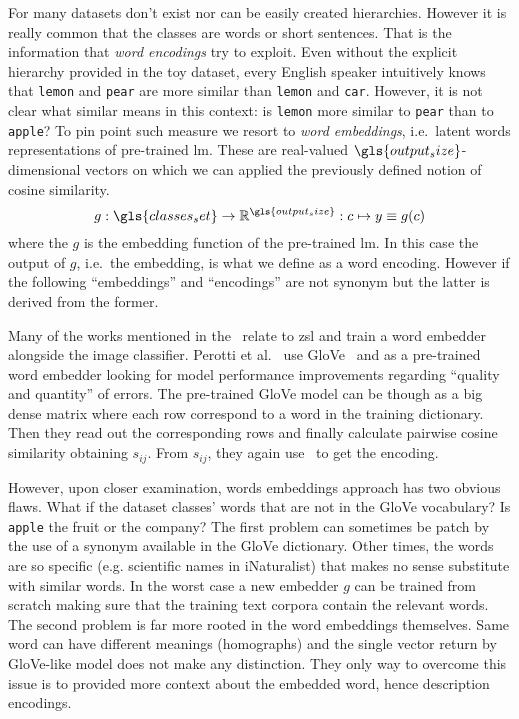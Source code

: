 For many datasets don't exist nor can be easily created hierarchies. However it
is really common that the classes are words or short sentences. That is the
information that \emph{word encodings} try to exploit. Even without the explicit
hierarchy provided in the toy dataset, every English speaker intuitively knows
that \texttt{lemon} and \texttt{pear} are more similar than \texttt{lemon} and
\texttt{car}. However, it is not clear what similar means in this context: is
\texttt{lemon} more similar to \texttt{pear} than to \texttt{apple}? To pin
point such measure we resort to \emph{word embeddings}, i.e.\ latent words
representations of pre-trained \acrshort{lm}. These are real-valued
$\gls{output_size}$-dimensional vectors on which we can applied the previously
defined notion of cosine similarity.
\begin{equation}
  g : \gls{classes_set} \to \mathbb{R}^{\gls{output_size}} :
  c \mapsto y \equiv g(c)
  \label{eq:word-encoding}
\end{equation}
where the $g$ is the embedding function of the pre-trained \acrshort{lm}. In
this case the output of $g$, i.e.\ the embedding, is what we define as a word
encoding. However if the following ``embeddings'' and ``encodings'' are not
synonym but the latter is derived from the former.

Many of the works mentioned in the~ relate to
\acrshort{zsl} and train a word embedder alongside the image classifier. Perotti
et al.~\cite{BeyondOneHotPerott2023} use GloVe~\cite{GloveGlobalVPennin2014} and
as a pre-trained word embedder looking for model performance improvements
regarding ``quality and quantity'' of errors. The pre-trained GloVe model can be
though as a big dense matrix where each row correspond to a word in the training
dictionary. Then they read out the corresponding rows and finally calculate
pairwise cosine similarity obtaining $s_{ij}$. From $s_{ij}$, they again
use~ to get the encoding.

However, upon closer examination, words embeddings approach has two obvious
flaws. What if the dataset classes' words that are not in the GloVe vocabulary?
Is \texttt{apple} the fruit or the company? The first problem can sometimes be
patch by the use of a synonym available in the GloVe dictionary. Other times,
the words are so specific (e.g. scientific names in iNaturalist) that makes no
sense substitute with similar words. In the worst case a new embedder $g$ can be
trained from scratch making sure that the training text corpora contain the
relevant words. The second problem is far more rooted in the word embeddings
themselves. Same word can have different meanings (homographs) and the single
vector return by GloVe-like model does not make any distinction. They only way
to overcome this issue is to provided more context about the embedded word,
hence description encodings.

